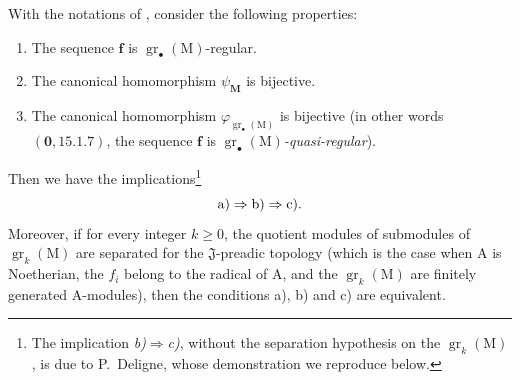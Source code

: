 \begin{theorem}[19.5.5]
\label{IV.19.5.5}
With the notations of \emph{}, consider the following properties:
\begin{enumerate}
\item[\rm a)] The sequence $\mathbf{f}$ is $\operatorname{gr}_\bullet(\mathrm{M})$-regular.
\item[\rm b)] The canonical homomorphism $\psi_\mathbf{M}$ is bijective.
\item[\rm c)] The canonical homomorphism $\varphi_{\operatorname{gr}_\bullet(\mathrm{M})}$ is bijective \textup{(in other words $(\mathbf{0},15.1.7)$, the sequence $\mathbf{f}$ is $\operatorname{gr}_\bullet(\mathrm{M})$\emph{-quasi-regular})}.
\end{enumerate}
Then we have the implications\footnote{The implication \emph{b)}$\Rightarrow$\emph{c)}, without the separation hypothesis on the $\operatorname{gr}_k(\mathrm{M})$, is due to P.~Deligne, whose demonstration we reproduce below.}
\[
  \textup{a)}\Rightarrow\textup{b)}\Rightarrow\textup{c)}.
\]
Moreover, if for every integer $k\geqslant 0$, the quotient modules of submodules of $\operatorname{gr}_k(\mathrm{M})$ are separated for the $\mathfrak{J}$-preadic topology \textup{(which is the case when $\mathrm{A}$ is Noetherian, the $f_i$ belong to the radical of $\mathrm{A}$, and the $\operatorname{gr}_k(\mathrm{M})$ are finitely generated $\mathrm{A}$-modules)}, then the conditions \textup{a)}, \textup{b)} and \textup{c)} are equivalent.
\end{theorem}

